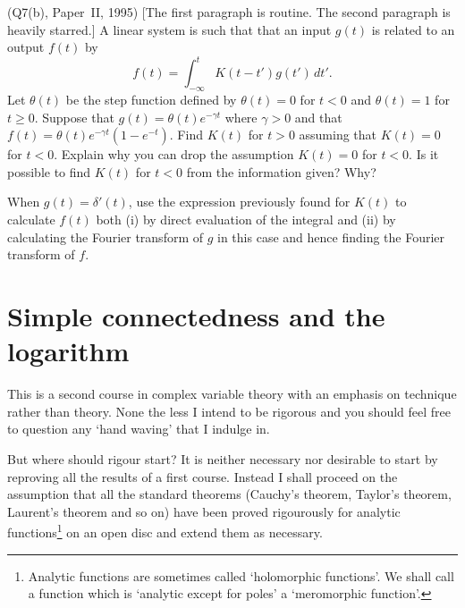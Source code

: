 \begin{question}(Q7(b), Paper~II, 1995) [The first paragraph
is routine. The second paragraph is heavily starred.]
A linear system is such that that an input $g(t)$ is related
to an output $f(t)$ by 
\[f(t)=\int_{-\infty}^{t}K(t-t')g(t')\,dt'.\]
Let $\theta(t)$ be the step function defined by
$\theta(t)=0$ for $t<0$ and $\theta(t)=1$ for
$t\geq 0$. Suppose that $g(t)=\theta(t)e^{-\gamma t}$
where $\gamma>0$ and that $f(t)=\theta(t)e^{-\gamma t}(1-e^{-t})$.
Find $K(t)$ for $t>0$ assuming that $K(t)=0$
for $t<0$. Explain why you can drop the assumption
$K(t)=0$ for $t<0$. Is it possible to find $K(t)$
for $t<0$ from the information given? Why?

When $g(t)=\delta'(t)$, use the expression previously found
for $K(t)$ to calculate $f(t)$ both 
(i) by direct evaluation of the integral and
(ii) by calculating the Fourier transform of $g$
in this case and hence finding the Fourier transform
of $f$.

\end{question}

\section{Simple connectedness and the logarithm} 
This is a second course in
complex variable theory with an emphasis on technique
rather than theory. None the less I intend to be
rigorous and you should feel free to question any
`hand waving' that I indulge in.

But where should rigour start? It is neither necessary nor
desirable to start by reproving all the results of 
a first course. Instead I shall proceed on the assumption
that all the standard theorems (Cauchy's theorem, Taylor's
theorem, Laurent's theorem and so on) have been proved
rigourously for analytic functions\footnote{Analytic functions
are sometimes called `holomorphic functions'. We shall call
a function which is `analytic except for poles' a
`meromorphic function'.} on an open disc
and extend them as necessary. 

